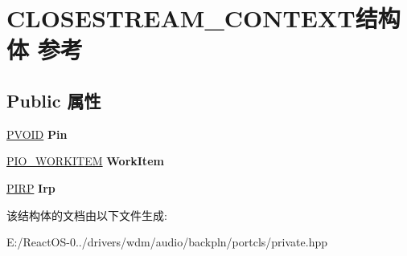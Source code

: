 \hypertarget{struct_c_l_o_s_e_s_t_r_e_a_m___c_o_n_t_e_x_t}{}\section{C\+L\+O\+S\+E\+S\+T\+R\+E\+A\+M\+\_\+\+C\+O\+N\+T\+E\+X\+T结构体 参考}
\label{struct_c_l_o_s_e_s_t_r_e_a_m___c_o_n_t_e_x_t}
\subsection*{Public 属性}
\begin{DoxyCompactItemize}
\item 
\mbox{\label{struct_c_l_o_s_e_s_t_r_e_a_m___c_o_n_t_e_x_t_a75d97f5f324b5c7a6e1297d2e137b133}} 
\hyperlink{interfacevoid}{P\+V\+O\+ID} {\bfseries Pin}
\item 
\mbox{\label{struct_c_l_o_s_e_s_t_r_e_a_m___c_o_n_t_e_x_t_a22a22d77d309f34f24eb5197c8ef4dba}} 
\hyperlink{struct___i_o___w_o_r_k_i_t_e_m}{P\+I\+O\+\_\+\+W\+O\+R\+K\+I\+T\+EM} {\bfseries Work\+Item}
\item 
\mbox{\label{struct_c_l_o_s_e_s_t_r_e_a_m___c_o_n_t_e_x_t_a590d225fcfc02dc7a6af9cf7239f1575}} 
\hyperlink{interfacevoid}{P\+I\+RP} {\bfseries Irp}
\end{DoxyCompactItemize}


该结构体的文档由以下文件生成\+:\begin{DoxyCompactItemize}
\item 
E\+:/\+React\+O\+S-\/0../drivers/wdm/audio/backpln/portcls/private.\+hpp\end{DoxyCompactItemize}
